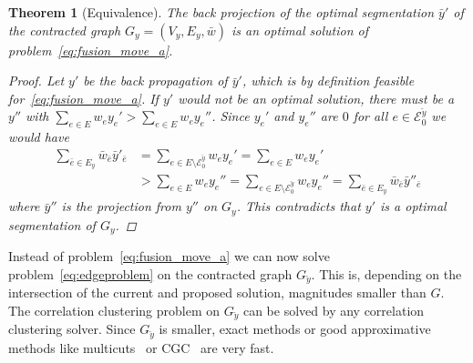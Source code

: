 \documentclass[10pt,twocolumn,letterpaper]{article}
\newtheorem{theorem}{Theorem}
\theoremstyle{definition}
\newtheorem{definition}{Definition}
\begin{document}



\begin{theorem}[Equivalence]\label{thm:Equivalence}
The back projection of the optimal segmentation $\bar{y}'$ of the contracted graph $G_y=(V_y,E_y, \bar{w})$
is an optimal solution of problem~\ref{eq:fusion_move_a}.
\begin{proof}
Let $y'$ be the back propagation of $\bar{y}'$, which is by definition feasible for~\ref{eq:fusion_move_a}.
If $y'$ would not be an optimal solution, there must be a $y''$ with 
$\sum_{e\in E} w_ey_e' > \sum_{e\in E} w_ey_e''$.
Since $y_e'$ and $y_e''$ are $0$ for all $e \in \mathcal{E}_0^{\breve{y}}$ we would have
\begin{align*}
  \sum_{\bar{e}\in E_y} \bar{w}_{\bar{e}}\bar{y}'_{\bar{e}}
 &= \sum_{e\in E \setminus \mathcal{E}_0^{\breve{y}}} w_ey_e'          
  = \sum_{e\in E} w_ey_e' \\
 &> \sum_{e\in E} w_ey_e''
  = \sum_{e\in E \setminus \mathcal{E}_0^{\breve{y}}} w_ey_e''
  =\sum_{\bar{e}\in E_y} \bar{w}_{\bar{e}}\bar{y}''_{\bar{e}}
\end{align*}
where $\bar{y}''$ is the projection from $y''$ on $G_y$.
This contradicts that $y'$ is a optimal segmentation of $G_y$.
\end{proof}
%
\end{theorem}

Instead of problem~\ref{eq:fusion_move_a} we can now solve problem~\ref{eq:edgeproblem} on the contracted graph $G_{\breve{y}}$.
This is, depending on the intersection of the current and proposed solution, magnitudes smaller than $G$.
The correlation clustering problem on $G_{\breve{y}}$ can be solved by any correlation clustering solver.
Since $G_{\breve{y}}$ is smaller, exact methods or good approximative methods like 
multicuts~\cite{kappes_2013_arxiv} or CGC~\cite{beier_2014_cvpr}
are very fast.
\end{document}
